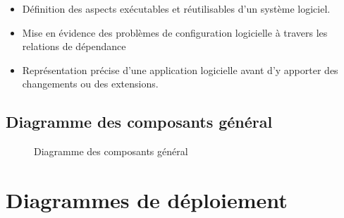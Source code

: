 \documentclass[12pt]{report}
\begin{document}
\begin{itemize}
    \item Définition des aspects exécutables et réutilisables d'un système logiciel.
    \item Mise en évidence des problèmes de configuration logicielle à travers les relations de dépendance
    \item Représentation précise d'une application logicielle avant d'y apporter des changements ou des extensions.
\end{itemize}

\subsection{Diagramme des composants général}

\begin{figure}[h]
\centering
    \centerline{}
    \caption{Diagramme des composants général}
\end{figure}

\newpage

\section{Diagrammes de déploiement}
\end{document}
